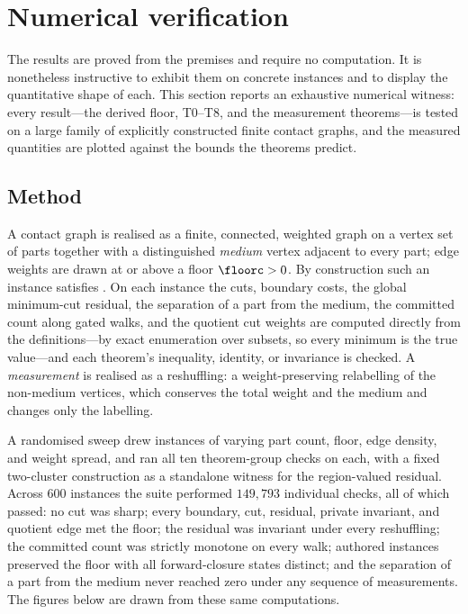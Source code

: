 
\section{Numerical verification}
\label{sec:validation}

The results are proved from the premises and require no computation. It is
nonetheless instructive to exhibit them on concrete instances and to display the
quantitative shape of each. This section reports an exhaustive numerical witness:
every result---the derived floor, T0--T8, and the measurement theorems---is tested
on a large family of explicitly constructed finite contact graphs, and the
measured quantities are plotted against the bounds the theorems predict.

\subsection{Method}

A contact graph is realised as a finite, connected, weighted graph on a vertex
set of parts together with a distinguished \emph{medium} vertex adjacent to every
part; edge weights are drawn at or above a floor $\floorc>0$. By construction such
an instance satisfies . On each instance the cuts, boundary
costs, the global minimum-cut residual, the separation of a part from the medium,
the committed count along gated walks, and the quotient cut weights are computed
directly from the definitions---by exact enumeration over subsets, so every
minimum is the true value---and each theorem's inequality, identity, or invariance
is checked. A \emph{measurement} is realised as a reshuffling: a weight-preserving
relabelling of the non-medium vertices, which conserves the total weight and the
medium and changes only the labelling.

A randomised sweep drew instances of varying part count, floor, edge density, and
weight spread, and ran all ten theorem-group checks on each, with a fixed
two-cluster construction as a standalone witness for the region-valued residual.
Across $600$ instances the suite performed $149{,}793$ individual checks, all of
which passed: no cut was sharp; every boundary, cut, residual, private invariant,
and quotient edge met the floor; the residual was invariant under every
reshuffling; the committed count was strictly monotone on every walk;
authored instances preserved the floor with all forward-closure states distinct;
and the separation of a part from the medium never reached zero under any sequence
of measurements. The figures below are drawn from these same computations.

